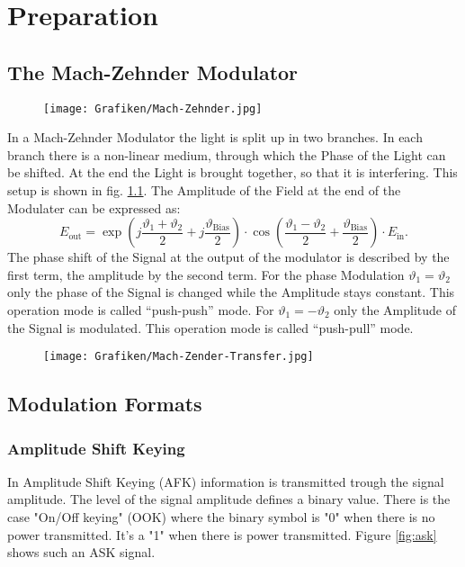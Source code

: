 \chapter{Preparation}
\section{The Mach-Zehnder Modulator}
\begin{figure}
  \centering
  \texttt{[image: Grafiken/Mach-Zehnder.jpg]}

\caption{}
\label{fig:MZI}
\end{figure}
In a Mach-Zehnder Modulator the light is split up in two branches. In each branch there is a non-linear medium, through which the Phase of the Light can be shifted. At the end the Light is brought together, so that it is interfering. This setup is shown in fig. \ref{fig:MZI}. The Amplitude of the Field at the end of the Modulater can be expressed as:
\begin{equation}
 E_{\mathrm{out}}=\exp\left(j\frac{\vartheta_1+\vartheta_2}{2}+j\frac{\vartheta_{\mathrm{Bias}}}{2} \right)\cdot\cos\left(\frac{\vartheta_1-\vartheta_2}{2}+\frac{\vartheta_{\mathrm{Bias}}}{2}\right)\cdot E_{\mathrm{in}} .
\end{equation}
The phase shift of the Signal at the output of the modulator is described by the first term, the amplitude by the second term. For the phase Modulation $\vartheta_1 = \vartheta_2$ only the phase of the Signal is changed while the Amplitude stays constant. This operation mode is called "`push-push"' mode. For $\vartheta_1 = -\vartheta_2$ only the Amplitude of the Signal is modulated. This operation mode is called "`push-pull"' mode.  \cite{OCS}

\begin{figure}
  \centering
  \texttt{[image: Grafiken/Mach-Zender-Transfer.jpg]}

\caption{}
\label{fig:MZI_plot}
\end{figure}


\section{Modulation Formats}
\subsection{Amplitude Shift Keying}
In Amplitude Shift Keying (AFK) information is transmitted trough the signal amplitude. The level of the signal amplitude defines a binary value. There is the case "On/Off keying" (OOK) where the binary symbol is "0" when there is no power transmitted. It's a "1" when there is power transmitted. 
Figure \ref{fig:ask} shows such an ASK signal.

